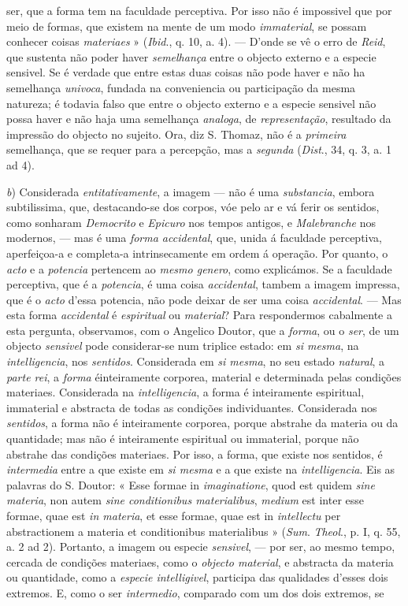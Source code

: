 ser, que a forma tem na faculdade perceptiva. Por isso não é impossivel que por meio de formas, que existem na mente de um modo \emph{immaterial}, se possam conhecer coisas \emph{materiaes} » (\emph{Ibid}., q. 10, a. 4). --- D'onde se vê o erro de \emph{Reid}, que sustenta não poder haver \emph{semelhança} entre o objecto externo e a especie sensivel. Se é verdade que entre estas duas coisas não pode haver e não ha semelhança \emph{univoca}, fundada na conveniencia ou participação da mesma natureza; é todavia falso que entre o objecto externo e a especie sensivel não possa haver e não haja uma semelhança \emph{analoga}, de \emph{representação}, resultado da impressão do objecto no sujeito. Ora, diz S. Thomaz, não é a \emph{primeira} semelhança, que se requer para a percepção, mas a \emph{segunda} (\emph{Dist}., 34, q. 3, a. 1 ad 4).\par \emph{b}) Considerada \emph{entitativamente}, a imagem --- não é uma \emph{substancia}, embora subtilissima, que, destacando-se dos corpos, vóe pelo ar e vá ferir os sentidos, como sonharam \emph{Democrito} e \emph{Epicuro} nos tempos antigos, e \emph{Malebranche} nos modernos, --- mas é uma \emph{forma accidental}, que, unida á faculdade perceptiva, aperfeiçoa-a e completa-a intrinsecamente em ordem á operação. Por quanto, o \emph{acto} e a \emph{potencia} pertencem ao \emph{mesmo genero}, como explicámos. Se a faculdade perceptiva, que é a \emph{potencia}, é uma coisa \emph{accidental}, tambem a imagem impressa, que é o \emph{acto} d'essa potencia, não pode deixar de ser uma coisa \emph{accidental}. --- Mas esta forma \emph{accidental} é \emph{espiritual} ou \emph{material}? Para respondermos cabalmente a esta pergunta, observamos, com o Angelico Doutor, que a \emph{forma}, ou o \emph{ser}, de um objecto \emph{sensivel} pode considerar-se num triplice estado: em \emph{si mesma}, na \emph{intelligencia}, nos \emph{sentidos}. Considerada em \emph{si mesma}, no seu estado \emph{natural}, a \emph{parte rei}, a \emph{forma} éinteiramente corporea, material e determinada pelas condições materiaes. Considerada na \emph{intelligencia}, a forma é inteiramente espiritual, immaterial e abstracta de todas as condições individuantes. Considerada nos \emph{sentidos}, a forma não é inteiramente corporea, porque abstrahe da materia ou da quantidade; mas não é inteiramente espiritual ou immaterial, porque não abstrahe das condições materiaes. Por isso, a forma, que existe nos sentidos, é \emph{intermedia} entre a que existe em \emph{si mesma} e a que existe na \emph{intelligencia}. Eis as palavras do S. Doutor: « Esse formae in \emph{imaginatione}, quod est quidem \emph{sine materia}, non autem \emph{sine conditionibus materialibus}, \emph{medium} est inter esse formae, quae est \emph{in materia}, et esse formae, quae est in \emph{intellectu} per abstractionem a materia et conditionibus materialibus » (\emph{Sum}. \emph{Theol}., p. I, q. 55, a. 2 ad 2). Portanto, a imagem ou especie \emph{sensivel}, --- por ser, ao mesmo tempo, cercada de condições materiaes, como o \emph{objecto material}, e abstracta da materia ou quantidade, como a \emph{especie intelligivel}, participa das qualidades d'esses dois extremos. E, como o ser \emph{intermedio}, comparado com um dos dois extremos, se 